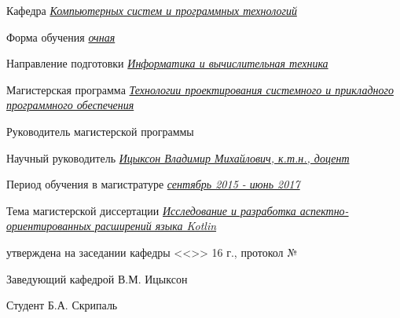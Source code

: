 \begin{flushleft}
    Кафедра \uline{\textit{Компьютерных систем и программных технологий} \hfill}

    \uline{\hfill}

    Форма обучения \uline{\textit{очная} \hfill}

    Направление подготовки \uline{\textit{Информатика и вычислительная техника} \hfill}

    \uline{\hfill}

    Магистерская программа \textit{\uline{Технологии проектирования системного и прикладного программного обеспечения\hfill}}

    \vspace{1em}

    Руководитель магистерской программы \uline{\hfill}

    \uline{\hfill}

    Научный руководитель \uline{\textit{Ицыксон Владимир Михайлович, к.т.н., доцент} \hfill}

    Период обучения в магистратуре \uline{\textit{сентябрь 2015 - июнь 2017} 
    \hfill}

    Тема магистерской диссертации \textit{\uline{Исследование и разработка 
    аспектно-ориентированных расширений языка Kotlin \hfill}}

    \vspace{1em}

    утверждена на заседании кафедры <<\uline{\hphantom{200}}>> 
    \uline{\hphantom{ноябрь}}
    16\uline{\hphantom{130}} г., протокол № \uline{\hphantom{1300}}

    \vspace{1em}

    Заведующий кафедрой \uline{\hfill} В.М. Ицыксон

    \vspace{1em}

    Студент \uline{\hfill} Б.А. Скрипаль
\end{flushleft}
